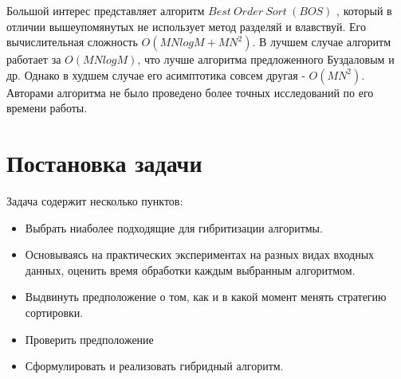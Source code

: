 Большой интерес представляет алгоритм $Best~Order~Sort~(BOS)$ \cite{BOS}, который в отличии вышеупомянутых не использует метод разделяй и влавствуй. Его вычислительная сложность $O(MNlogM+MN^2)$. В лучшем случае алгоритм работает за $O(MNlogM)$, что лучше алгоритма предложенного Буздаловым и др. Однако в худшем случае его асимптотика совсем другая - $O(MN^2)$. Авторами алгоритма не было проведено более точных исследований по его времени работы. 

\section{Постановка задачи}

Задача содержит несколько пунктов: 
\begin{itemize}
	\item Выбрать ниаболее подходящие для гибритизации алгоритмы.
	\item Основываясь на практических экспериментах на разных видах входных данных, оценить время обработки каждым выбранным алгоритмом. 	
	\item Выдвинуть предположение о том, как и в какой момент менять стратегию сортировки. 
	\item Проверить предположение
	\item Сформулировать и реализовать гибридный алгоритм.
\end{itemize} 